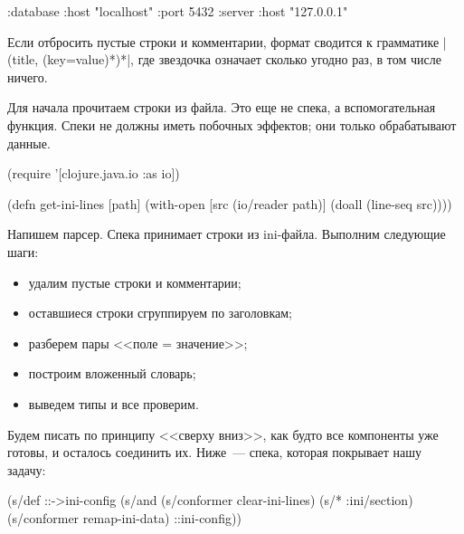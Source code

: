 \begin{english}
  \begin{clojure}
{:database {:host "localhost"
            :port 5432}
 :server {:host "127.0.0.1"}}
  \end{clojure}
\end{english}

Если отбросить пустые строки и комментарии, формат сводится к грамматике
\spverb|(title, (key=value)*)*|, где звездочка означает сколько угодно раз, в
том числе ничего.

Для начала прочитаем строки из файла. Это еще не спека, а вспомогательная
функция. Спеки не должны иметь побочных эффектов; они только обрабатывают
данные.

\begin{english}
  \begin{clojure}
(require '[clojure.java.io :as io])

(defn get-ini-lines [path]
  (with-open [src (io/reader path)]
    (doall (line-seq src))))
  \end{clojure}
\end{english}

Напишем парсер. Спека принимает строки из ini-файла. Выполним следующие шаги:

\begin{itemize}

\item
  удалим пустые строки и комментарии;

\item
  оставшиеся строки сгруппируем по заголовкам;

\item
  разберем пары <<поле = значение>>;

\item
  построим вложенный словарь;

\item
  выведем типы и все проверим.

\end{itemize}

Будем писать по принципу <<сверху вниз>>, как будто все компоненты уже готовы, и
осталось соединить их. Ниже~--- спека, которая покрывает нашу задачу:

\begin{english}
  \begin{clojure}
(s/def ::->ini-config
  (s/and
   (s/conformer clear-ini-lines)
   (s/* :ini/section)
   (s/conformer remap-ini-data)
   ::ini-config))
  \end{clojure}
\end{english}

